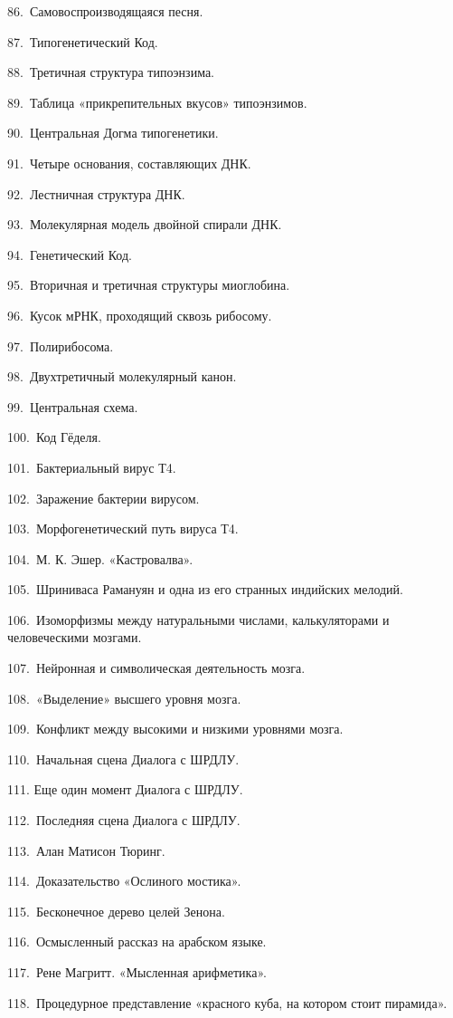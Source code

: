 \documentclass[../main.tex]{subfiles}
\begin{document}
86.~Самовоспроизводящаяся песня.

87.~Типогенетический Код.

88.~Третичная структура типоэнзима.

89.~Таблица «прикрепительных вкусов» типоэнзимов.

90.~Центральная Догма типогенетики.

91.~Четыре основания, составляющих ДНК.

92.~Лестничная структура ДНК.

93.~Молекулярная модель двойной спирали ДНК.

94.~Генетический Код.

95.~Вторичная и третичная структуры миоглобина.

96.~Кусок мРНК, проходящий сквозь рибосому.

97.~Полирибосома.

98.~Двухтретичный молекулярный канон.

99.~Центральная схема.

100.~Код Гёделя.

101.~Бактериальный вирус Т4.

102.~Заражение бактерии вирусом.

103.~Морфогенетический путь вируса Т4.

104.~М. К. Эшер. «Кастровалва».

105.~Шриниваса Рамануян и одна из его странных индийских мелодий.

106.~Изоморфизмы между натуральными числами, калькуляторами и человеческими мозгами.

107.~Нейронная и символическая деятельность мозга.

108.~«Выделение» высшего уровня мозга.

109.~Конфликт между высокими и низкими уровнями мозга.

110.~Начальная сцена Диалога с ШРДЛУ.

111. Еще один момент Диалога с ШРДЛУ.

112.~Последняя сцена Диалога с ШРДЛУ.

113.~Алан Матисон Тюринг.

114.~Доказательство «Ослиного мостика».

115.~Бесконечное дерево целей Зенона.

116.~Осмысленный рассказ на арабском языке.

117.~Рене Магритт. «Мысленная арифметика».

118.~Процедурное представление «красного куба, на котором стоит пирамида».
\end{document}
